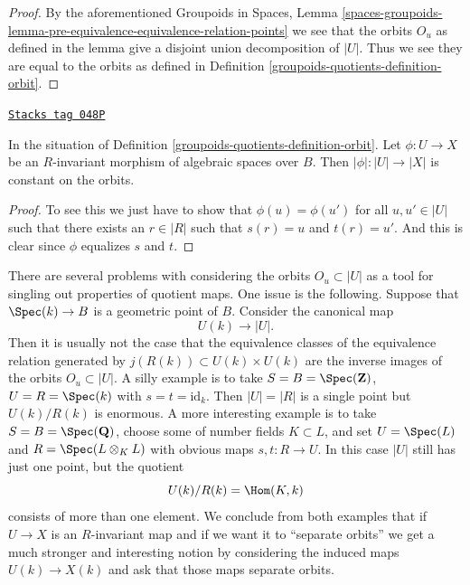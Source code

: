 \begin{proof}
By the aforementioned
Groupoids in Spaces,
Lemma \ref{spaces-groupoids-lemma-pre-equivalence-equivalence-relation-points}
we see that the orbits $O_u$ as defined in the lemma give a disjoint
union decomposition of $|U|$. Thus we see they are equal to the
orbits as defined in Definition \ref{groupoids-quotients-definition-orbit}.
\end{proof}

\begin{lemma}
\label{groupoids-quotients-lemma-invariant-map-constant-on-orbit}
\href{https://stacks.math.columbia.edu/tag/048P}{\texttt{Stacks tag 048P}}

In the situation of Definition \ref{groupoids-quotients-definition-orbit}.
Let $\phi : U \to X$ be an $R$-invariant morphism of algebraic spaces over
$B$. Then $|\phi| : |U| \to |X|$ is constant on the orbits.
\end{lemma}

\begin{proof}
To see this we just have to show that $\phi(u) = \phi(u')$
for all $u, u' \in |U|$ such that
there exists an $r \in |R|$ such that $s(r) = u$ and $t(r) = u'$.
And this is clear since $\phi$ equalizes $s$ and $t$.
\end{proof}

There are several problems with considering the orbits $O_u \subset |U|$
as a tool for singling out properties of quotient maps. One issue is the
following. Suppose that $\Spec(k) \to B$
is a geometric point of $B$. Consider the canonical map
$$
U(k) \longrightarrow |U|.
$$
Then it is usually not the case that the equivalence classes
of the equivalence relation generated by $j(R(k)) \subset U(k) \times U(k)$
are the inverse images of the orbits $O_u \subset |U|$.
A silly example is to take $S = B = \Spec(\mathbf{Z})$,
$U = R = \Spec(k)$ with $s = t = \text{id}_k$. Then $|U| = |R|$ is
a single point but $U(k)/R(k)$ is enormous.
A more interesting example is to take $S = B = \Spec(\mathbf{Q})$,
choose some of number fields $K \subset L$, and set $U = \Spec(L)$
and $R = \Spec(L \otimes_K L)$ with obvious maps $s, t : R \to U$.
In this case $|U|$ still has just one point, but the quotient
$$
U(k)/R(k) = \Hom(K, k)
$$
consists of more than one element. We conclude from both examples
that if $U \to X$ is an $R$-invariant map and if we want it to
``separate orbits'' we get a much stronger and interesting notion by
considering the induced maps $U(k) \to X(k)$ and ask that
those maps separate orbits.

